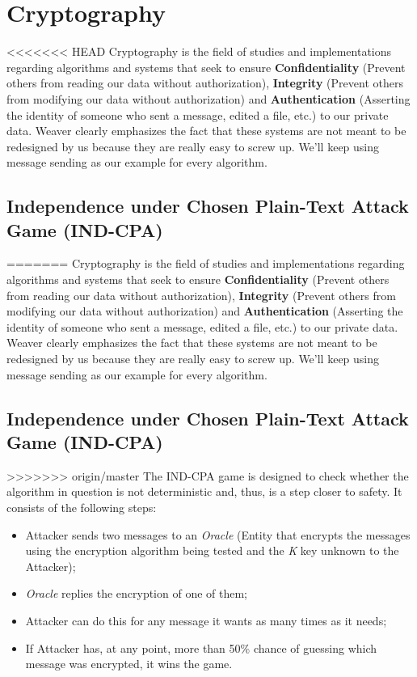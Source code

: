 \documentclass[11pt]{article}
\begin{document}
\section{Cryptography}
<<<<<<< HEAD
\label{sec:org658d171}
Cryptography is the field of studies and implementations regarding algorithms and systems that seek to ensure \textbf{Confidentiality} (Prevent others from reading our data without authorization), \textbf{Integrity} (Prevent others from modifying our data without authorization) and \textbf{Authentication} (Asserting the identity of someone who sent a message, edited a file, etc.) to our private data. Weaver clearly emphasizes the fact that these systems are not meant to be redesigned by us because they are really easy to screw up. We'll keep using message sending as our example for every algorithm.
\subsection{Independence under Chosen Plain-Text Attack Game (IND-CPA)}
\label{sec:org17584bf}
=======
\label{sec:orgaefcc1b}
Cryptography is the field of studies and implementations regarding algorithms and systems that seek to ensure \textbf{Confidentiality} (Prevent others from reading our data without authorization), \textbf{Integrity} (Prevent others from modifying our data without authorization) and \textbf{Authentication} (Asserting the identity of someone who sent a message, edited a file, etc.) to our private data. Weaver clearly emphasizes the fact that these systems are not meant to be redesigned by us because they are really easy to screw up. We'll keep using message sending as our example for every algorithm.
\subsection{Independence under Chosen Plain-Text Attack Game (IND-CPA)}
\label{sec:orgc5d52eb}
>>>>>>> origin/master
The IND-CPA game is designed to check whether the algorithm in question is not deterministic and, thus, is a step closer to safety. It consists of the following steps:
\begin{itemize}
\item Attacker sends two messages to an \emph{Oracle} (Entity that encrypts the messages using the encryption algorithm being tested and the \emph{K} key unknown to the Attacker);
\item \emph{Oracle} replies the encryption of one of them;
\item Attacker can do this for any message it wants as many times as it needs;
\item If Attacker has, at any point, more than 50\% chance of guessing which message was encrypted, it wins the game.
\end{itemize}
\end{document}
